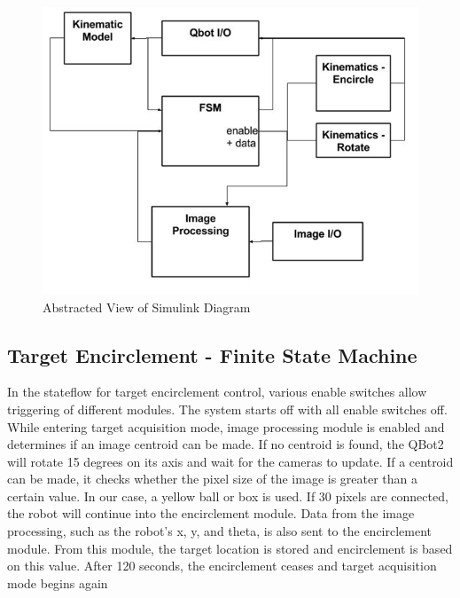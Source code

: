 \begin{figure}[htbp]
\begin{center}
\includegraphics[width=5in]{8}
\caption{Abstracted View of Simulink Diagram} \label{fig:8}
\end{center}
\end{figure}

\subsection{Target Encirclement - Finite State Machine}
In the stateflow for target encirclement control, various enable switches allow triggering of different modules. The system starts off with all enable switches off. While entering target acquisition mode, image processing module is enabled and determines if an image centroid can be made. If no centroid is found, the QBot2 will rotate 15 degrees on its axis and wait for the cameras to update. If a centroid can be made, it checks whether the pixel size of the image is greater than a certain value. In our case, a yellow ball or box is used. If 30 pixels are connected, the robot will continue into the encirclement module. Data from the image processing, such as the robot’s x, y, and theta, is also sent to the encirclement module. From this module, the target location is stored and encirclement is based on this value. After 120 seconds, the encirclement ceases and target acquisition mode begins again


